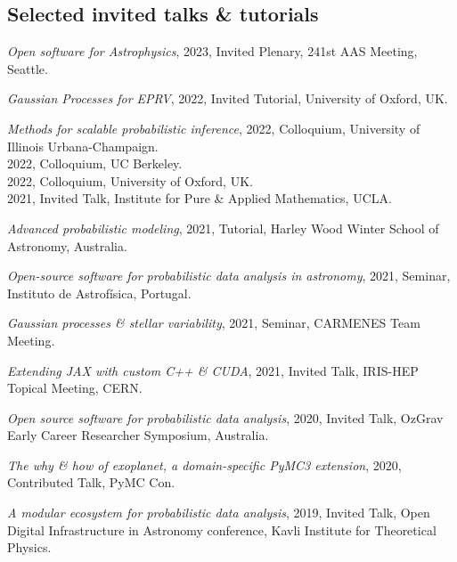 \documentclass[12pt,letterpaper]{article}
\begin{document}
\subsection{Selected invited talks \& tutorials}
\begin{list}{}{\cvlist}

  \item \emph{Open software for Astrophysics},
      2023, Invited Plenary, 241st AAS Meeting, Seattle.

  \item \emph{Gaussian Processes for EPRV},
      2022, Invited Tutorial, University of Oxford, UK.

  \item \emph{Methods for scalable probabilistic inference},
      2022, Colloquium, University of Illinois Urbana-Champaign.\\
      2022, Colloquium, UC Berkeley.\\
      2022, Colloquium, University of Oxford, UK.\\
      2021, Invited Talk, Institute for Pure \& Applied Mathematics, UCLA.

  \item \emph{Advanced probabilistic modeling},
      2021, Tutorial, Harley Wood Winter School of Astronomy, Australia.

  \item \emph{Open-source software for probabilistic data analysis in astronomy},
      2021, Seminar, Instituto de Astrof\'isica, Portugal.

  \item \emph{Gaussian processes \& stellar variability},
      2021, Seminar, CARMENES Team Meeting.

  \item \emph{Extending JAX with custom C++ \& CUDA},
        2021, Invited Talk, IRIS-HEP Topical Meeting, CERN.

  \item \emph{Open source software for probabilistic data analysis},
        2020, Invited Talk, OzGrav Early Career Researcher Symposium, Australia.

  \item \emph{The why \& how of exoplanet, a domain-specific PyMC3 extension},
        2020, Contributed Talk, PyMC Con.

  \item \emph{A modular ecosystem for probabilistic data analysis},
        2019, Invited Talk, Open Digital Infrastructure in Astronomy conference,
        Kavli Institute for Theoretical Physics.


\end{list}
\end{document}
